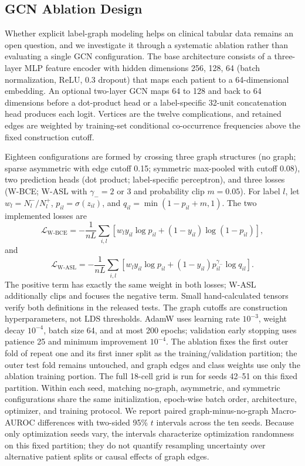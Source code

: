 \documentclass{ieeeaccess}
\begin{document}
\subsection{GCN Ablation Design}

Whether explicit label-graph modeling helps on clinical tabular data remains an open question, and we investigate it through a systematic ablation rather than evaluating a single GCN configuration. The base architecture consists of a three-layer MLP feature encoder with hidden dimensions 256, 128, 64 (batch normalization, ReLU, 0.3 dropout) that maps each patient to a 64-dimensional embedding. An optional two-layer GCN maps 64 to 128 and back to 64 dimensions before a dot-product head or a label-specific 32-unit concatenation head produces each logit. Vertices are the twelve complications, and retained edges are weighted by training-set conditional co-occurrence frequencies above the fixed construction cutoff.

Eighteen configurations are formed by crossing three graph structures (no graph; sparse asymmetric with edge cutoff 0.15; symmetric max-pooled with cutoff 0.08), two prediction heads (dot product; label-specific perceptron), and three losses (W-BCE; W-ASL \cite{ridnik2021} with $\gamma_-=2$ or 3 and probability clip $m=0.05$). For label $l$, let $w_l=N_l^-/N_l^+$, $p_{il}=\sigma(z_{il})$, and $q_{il}=\min(1-p_{il}+m,1)$. The two implemented losses are
\begin{equation}
\mathcal{L}_{\mathrm{W\mbox{-}BCE}}=-\frac{1}{nL}\sum_{i,l}\left[w_l y_{il}\log p_{il}+(1-y_{il})\log(1-p_{il})\right],
\label{eq:wbce}
\end{equation}
and
\begin{equation}
\mathcal{L}_{\mathrm{W\mbox{-}ASL}}=-\frac{1}{nL}\sum_{i,l}\left[w_l y_{il}\log p_{il}+(1-y_{il})p_{il}^{\gamma_-}\log q_{il}\right].
\label{eq:wasl}
\end{equation}
The positive term has exactly the same weight in both losses; W-ASL additionally clips and focuses the negative term. Small hand-calculated tensors verify both definitions in the released tests. The graph cutoffs are construction hyperparameters, not $\mathrm{LDS}$ thresholds. AdamW uses learning rate $10^{-3}$, weight decay $10^{-4}$, batch size 64, and at most 200 epochs; validation early stopping uses patience 25 and minimum improvement $10^{-4}$. The ablation fixes the first outer fold of repeat one and its first inner split as the training/validation partition; the outer test fold remains untouched, and graph edges and class weights use only the ablation training portion. The full 18-cell grid is run for seeds 42--51 on this fixed partition. Within each seed, matching no-graph, asymmetric, and symmetric configurations share the same initialization, epoch-wise batch order, architecture, optimizer, and training protocol. We report paired graph-minus-no-graph Macro-AUROC differences with two-sided 95\% $t$ intervals across the ten seeds. Because only optimization seeds vary, the intervals characterize optimization randomness on this fixed partition; they do not quantify resampling uncertainty over alternative patient splits or causal effects of graph edges.
\end{document}
